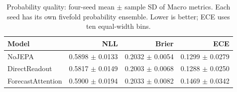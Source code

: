 \begin{table}[t]
\centering
\small
\caption{Probability quality: four-seed mean $\pm$ sample SD of Macro metrics. Each seed has its own fivefold probability ensemble. Lower is better; ECE uses ten equal-width bins.}
\label{tab:calibration}
\begin{tabular}{lrrr}
\toprule
Model & NLL & Brier & ECE \\
\midrule
NoJEPA & 0.5898 $\pm$ 0.0133 & 0.2032 $\pm$ 0.0054 & 0.1299 $\pm$ 0.0279 \\
DirectReadout & 0.5817 $\pm$ 0.0149 & 0.2003 $\pm$ 0.0068 & 0.1288 $\pm$ 0.0250 \\
ForecastAttention & 0.5900 $\pm$ 0.0194 & 0.2033 $\pm$ 0.0082 & 0.1469 $\pm$ 0.0342 \\
\bottomrule
\end{tabular}
\end{table}
